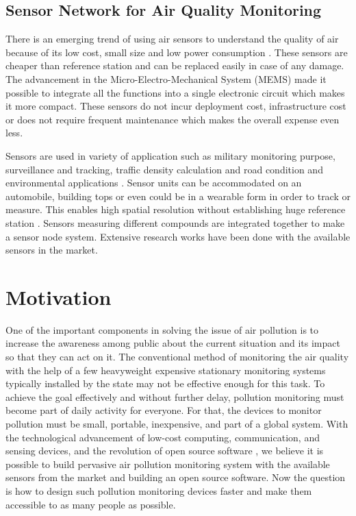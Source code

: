 \subsection{Sensor Network for Air Quality Monitoring}

There is an emerging trend of using air sensors to understand the quality of air because of its low cost, small size and low power consumption \cite{Sun2016}. These sensors are cheaper than reference station and can be replaced easily in case of any damage. The advancement in the Micro-Electro-Mechanical System (MEMS) made it possible to integrate all the functions into a single electronic circuit which makes it more compact. These sensors do not incur deployment cost, infrastructure cost or does not require frequent maintenance which makes the overall expense even less.
\par

Sensors are used in variety of application such as military monitoring purpose, surveillance and tracking, traffic density calculation and road condition and environmental applications \cite{Kadri2013}. Sensor units can be accommodated on an automobile, building tops or even could be in a wearable form in order to track or measure. This enables high spatial resolution without establishing huge reference station \cite{Nodes2015}. Sensors measuring different compounds are integrated together to make a sensor node system. Extensive research works have been done with the available sensors in the market.

\section{Motivation}

One of the important components in solving the issue of air pollution is to increase the awareness among public about the current situation and its impact so that they can act on it. The conventional method of monitoring the air quality with the help of a few heavyweight expensive stationary monitoring systems typically installed by the state may not be effective enough for this task. To achieve the goal effectively and without further delay, pollution monitoring must become part of daily activity for everyone. For that, the devices to monitor pollution must be small, portable, inexpensive, and part of a global system. With the technological advancement of low-cost computing, communication, and sensing devices, and the revolution of open source software \cite{Anthes2016}, we believe it is possible to build pervasive air pollution monitoring system with the available sensors from the market and building an open source software. Now the question is how to design such pollution monitoring devices faster and make them accessible to as many people as possible. 


